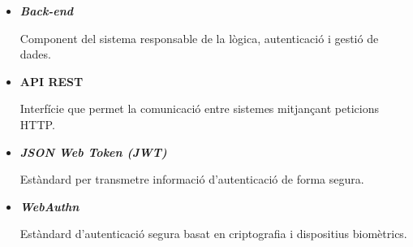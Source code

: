 \begin{itemize}
\item \hypertarget{def:backend}{\textbf{\textit{Back-end}}} Component del sistema responsable de la lògica, autenticació i gestió de dades.

\item \hypertarget{def:apirest}{\textbf{API REST}} Interfície que permet la comunicació entre sistemes mitjançant peticions HTTP.

\item \hypertarget{def:jwt}{\textbf{\textit{JSON Web Token (JWT)}}} Estàndard per transmetre informació d'autenticació de forma segura.

\item \hypertarget{def:webauthn}{\textbf{\textit{WebAuthn}}} Estàndard d'autenticació segura basat en criptografia i dispositius biomètrics.

\end{itemize}